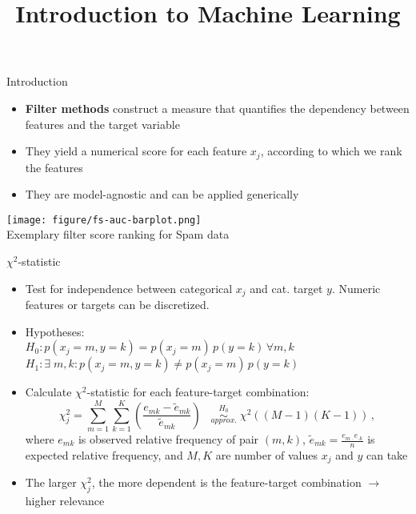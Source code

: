 \documentclass[11pt,compress,t,notes=noshow, xcolor=table]{beamer}
\title{Introduction to Machine Learning}
\date{}
\begin{document}

  \begin{vbframe}{Introduction}
  \vspace{0.4cm}
  \begin{itemize}
  \setlength{\itemsep}{0.8em}
    \item \textbf{Filter methods} construct a measure that quantifies the dependency between features and the target variable
    \item They yield a numerical score for each feature $x_j$, according to which we rank the features
    \item They are model-agnostic and can be applied generically
  \end{itemize}
  \vspace{-0.2cm}
  \begin{center}
  \texttt{[image: figure/fs-auc-barplot.png]}\\
  \footnotesize{Exemplary filter score ranking for Spam data}
  \end{center}
  
  \end{vbframe}



  \begin{vbframe}{$\chi^2$-statistic}
  \begin{itemize}
    \item Test for independence between categorical $x_j$ and cat. target $y$. Numeric features or targets can be discretized.
    \item Hypotheses: \\
    $H_0: p(x_j = m, y = k) = p(x_j = m)\, p(y = k) \,\forall m, k$\\


    $H_1: \exists \; m, k: p(x_j = m, y = k) \neq p(x_j = m)\, p(y = k)$
    \item Calculate $\chi^2$-statistic for each feature-target combination:
      $$ \chi_j^2 = \sum_{m = 1}^{M} \sum_{k=1}^{K} (\frac{e_{mk} - \tilde{e}_{mk}}{\tilde{e}_{mk}}) \;\;\;   \stackrel{H_0}{\underset{approx.}{\sim}} \; \chi^2 ((M-1)(K-1))\,,$$
    where $e_{mk}$ is observed relative frequency of pair $(m,k)$, $\tilde{e}_{mk} = \frac{e_{m \cdot} e_{\cdot k}}{n}$ is expected relative frequency, and $M,K$ are number of values $x_j$ and $y$ can take
    \item The larger $\chi_j^2$, the more dependent is the feature-target combination $\rightarrow$ higher relevance
  \end{itemize}
  \end{vbframe}
\end{document}
